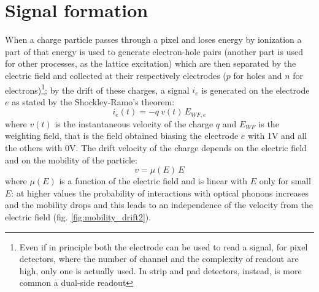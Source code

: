 
\section{Signal formation}
    When a charge particle passes through a pixel and loses energy by ionization a part of that energy is used to generate electron-hole pairs (another part is used for other processes, as the lattice excitation) which are then separated by the electric field and collected at their respectively electrodes ($p$ for holes and $n$ for electrons)\footnote{Even if in principle both the electrode can be used to read a signal, for pixel detectors, where the number of channel and the complexity of readout are high, only one is actually used. In strip and pad detectors, instead, is more common a dual-side readout}; by the drift of these charges, a signal $i_e$ is generated on the  electrode $e$ as stated by the Shockley-Ramo's theorem: 
    \begin{equation}
        i_e(t) = -q\: v(t)\, E_{WF,e}
    \end{equation}
    where $v(t)$ is the instantaneous velocity of the charge $q$ and $E_{WF}$ is the weighting field, that is the field obtained biasing the electrode $e$ with 1V and all the others with 0V. The drift velocity of the charge depends on the electric field and on the mobility of the particle:
    \begin{equation}
        v = \mu(E)\, E
    \end{equation}
    where $\mu(E)$ is a function of the electric field and is linear with $E$ only for small $E$: at higher values the probability of interactions with optical phonons increases and the mobility drops and this leads to an independence of the velocity from the electric field (fig. \ref{fig:mobility_drift2}).
   
